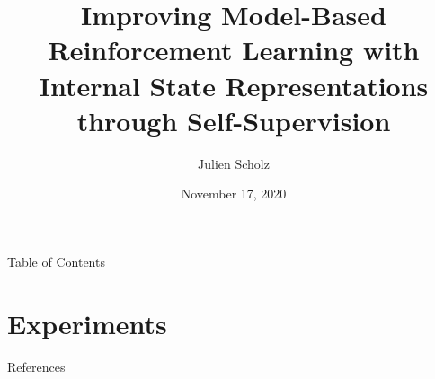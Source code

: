 \documentclass{beamer}
\title{Improving Model-Based Reinforcement Learning with Internal State Representations through Self-Supervision}
\author{Julien Scholz}
\date{November 17, 2020}
\institute{Supervised by Dr. Cornelius Weber and Burhan Hafez}
\begin{document}
\frame{\titlepage}



\begin{frame}{Table of Contents}
  \tableofcontents
\end{frame}



\section{Experiments}



\begin{frame}[allowframebreaks]{References}


\end{frame}


\end{document}
